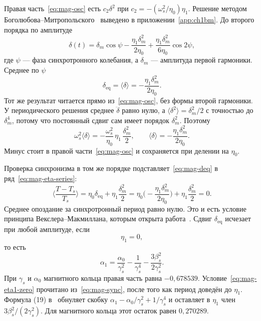 Правая часть~\eqref{eq:mag-osc} есть $c_2\delta^2$ при $c_2=-(\omega_s^2/\eta_0)\eta_1$. Решение методом Боголюбова--Митропольского~\cite{Bogoliubov1961} выведено в приложении~\ref{app:ch1bm}. До второго порядка по амплитуде
\begin{equation}
\label{eq:mag-delta-sol}
\delta(t)
=\delta_m\cos\psi
-\frac{\eta_1\delta_m^2}{2\eta_0}
+\frac{\eta_1\delta_m^2}{6\eta_0}\cos 2\psi,
\end{equation}
где $\psi$ --- фаза синхротронного колебания, а $\delta_m$ --- амплитуда первой гармоники. Среднее по $\psi$
\begin{equation}
\label{eq:mag-deq}
\delta_{\mathrm{eq}}
=\langle\delta\rangle
=-\frac{\eta_1\delta_m^2}{2\eta_0}.
\end{equation}
Тот же результат читается прямо из~\eqref{eq:mag-osc}, без формы второй гармоники. У периодического решения среднее $\ddot\delta$ равно нулю, а $\langle\delta^2\rangle=\delta_m^2/2$ с точностью до $\delta_m^4$, потому что постоянный сдвиг сам имеет порядок $\delta_m^2$. Поэтому
\begin{equation}
\label{eq:mag-average-osc}
\omega_s^2\langle\delta\rangle
=-\frac{\omega_s^2}{\eta_0}\,\eta_1\,\frac{\delta_m^2}{2},
\qquad
\langle\delta\rangle=-\frac{\eta_1\delta_m^2}{2\eta_0}.
\end{equation}
Минус стоит в правой части~\eqref{eq:mag-osc} и сохраняется при делении на $\eta_0$.

Проверка синхронизма в том же порядке подставляет~\eqref{eq:mag-deq} в ряд~\eqref{eq:mag-eta-series}:
\begin{equation}
\label{eq:mag-sync}
\Biggl\langle\frac{T-T_s}{T_s}\Biggr\rangle
=\eta_0\delta_{\mathrm{eq}}+\eta_1\frac{\delta_m^2}{2}
=\eta_0\Biggl(-\frac{\eta_1\delta_m^2}{2\eta_0}\Biggr)+\eta_1\frac{\delta_m^2}{2}
=0.
\end{equation}
Среднее опоздание за синхротронный период равно нулю. Это и есть условие принципа Векслера--Макмиллана, которым открыта работа~\cite{Senichev2013}. Сдвиг $\delta_{\mathrm{eq}}$ исчезает при любой амплитуде, если
\begin{equation}
\label{eq:mag-eta1-zero}
\eta_1=0,
\end{equation}
то есть
\begin{equation}
\label{eq:mag-alpha1-comp}
\alpha_1
=\frac{\alpha_0}{\gamma_s^2}-\frac{1}{\gamma_s^4}-\frac{3\beta_s^2}{2\gamma_s^2}.
\end{equation}
При $\gamma_s$ и $\alpha_0$ магнитного кольца правая часть равна $-0{,}678539$. Условие~\eqref{eq:mag-eta1-zero} прочитано из~\eqref{eq:mag-sync}, после того как период доведён до $\eta_1$. Формула (19) в~\cite{Senichev2013} обнуляет скобку $\alpha_1-\alpha_0/\gamma_s^2+1/\gamma_s^4$ и оставляет в $\eta_1$ член $3\beta_s^2/(2\gamma_s^2)$. Для магнитного кольца этот остаток равен $0{,}270289$.

